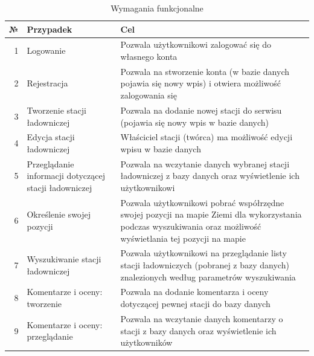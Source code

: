 \begin{table}[htb] \small
    \caption{Wymagania funkcjonalne}
    \label{tab:wymaganiafunkcjonalne}
    \begin{tabularx}{\linewidth}{| r | p{6cm} | X |} 
    \hline
    № & Przypadek & Cel \\
    \hline
    1 & Logowanie & Pozwala użytkownikowi zalogować się do własnego konta \\ 
    \hline
    2 & Rejestracja & Pozwala na stworzenie konta (w bazie danych pojawia się nowy wpis) i otwiera możliwość zalogowania się \\ 
    \hline
    3 & Tworzenie stacji ładowniczej & Pozwala na dodanie nowej stacji do serwisu (pojawia się nowy wpis w bazie danych) \\
    \hline
    4 & Edycja stacji ładowniczej & Właściciel stacji (twórca) ma możliwość edycji wpisu w bazie danych \\
    \hline
    5 & Przeglądanie informacji dotyczącej stacji ładowniczej & Pozwala na wczytanie danych wybranej stacji ładowniczej z bazy danych oraz wyświetlenie ich użytkownikowi \\
    \hline
    6 & Określenie swojej pozycji & Pozwala użytkownikowi pobrać współrzędne swojej pozycji na mapie Ziemi dla wykorzystania podczas wyszukiwania oraz możliwość wyświetlania tej pozycji na mapie \\
    \hline
    7 & Wyszukiwanie stacji ładowniczej & Pozwala użytkownikowi na przeglądanie listy stacji ładowniczych (pobranej z bazy danych) znalezionych według parametrów wyszukiwania \\
    \hline
    8 & Komentarze i oceny: tworzenie  & Pozwala na dodanie komentarza i oceny dotyczącej pewnej stacji do bazy danych \\
    \hline
    9 & Komentarze i oceny: przeglądanie  & Pozwala na wczytanie danych komentarzy o stacji z bazy danych oraz wyświetlenie ich użytkowników \\
    \hline
\end{tabularx}
\end{table}


